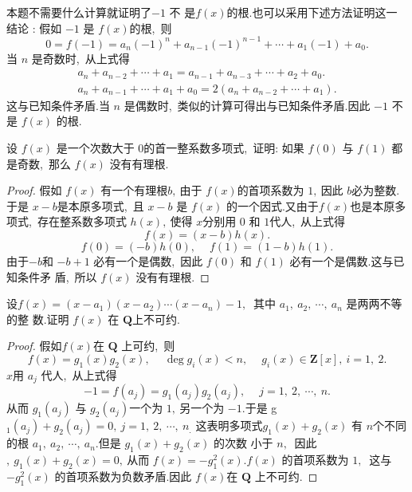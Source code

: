 \begin{note}
	本题不需要什么计算就证明了$-1$ 不 是$  f(x)  $的根.也可以采用下述方法证明这一结论 : 假如  $-1$  是 $ f(x)  $的根,\  则
	$$0=f(-1)=a_{n}(-1)^{n}+a_{n-1}(-1)^{n-1}+\cdots+a_{1}(-1)+a_{0} .$$
	当  $n $ 是奇数时,\  从上式得
	$$\begin{array}{l}
		a_{n}+a_{n-2}+\cdots+a_{1}=a_{n-1}+a_{n-3}+\cdots+a_{2}+a_{0} . \\
		a_{n}+a_{n-1}+\cdots+a_{1}+a_{0}=2\left(a_{n}+a_{n-2}+\cdots+a_{1}\right) .
	\end{array}$$
	这与已知条件矛盾.当 $ n $ 是偶数时,\  类似的计算可得出与已知条件矛盾.因此  $-1$  不是 $ f(x) $ 的根.
\end{note}
\newpage
\begin{problem}
	设  $f(x) $ 是一个次数大于 $0 $的首一整系数多项式,\  证明: 如果 $ f(0) $ 与 $ f(1) $ 都 是奇数,\ 那么  $f(x) $ 没有有理根.
\end{problem}
\begin{proof}
	假如 $ f(x) $ 有一个有理根$  b ,\  $由于 $ f(x)  $的首项系数为 $1 ,\  $因此  $b  $必为整数.于是  $x-b  $是本原多项式,\  且  $x-b $ 是  $f(x) $ 的一个因式.又由于$  f(x)  $也是本原多项式,\ 存在整系数多项式  $h(x) ,\  $使得
	$x  $分别用 $0$ 和 $1 $代人,\  从上式得
	$$f(x)=(x-b) h(x) .$$
	$$f(0)=(-b) h(0),\  \quad f(1)=(1-b) h(1) .$$
	由于$  -b  $和 $ -b+1 $ 必有一个是偶数,\  因此 $ f(0) $ 和 $ f(1) $ 必有一个是偶数.这与已知条件矛 盾,\  所以 $ f(x) $ 没有有理根.
\end{proof}
\newpage
\begin{problem}
	设$  f(x)=\left(x-a_{1}\right)\left(x-a_{2}\right) \cdots\left(x-a_{n}\right)-1 ,\ $ 其中 $ a_{1},\  a_{2},\  \cdots,\  a_{n}$  是两两不等的整 数.证明 $ f(x) $ 在  $\mathbf{Q}  $上不可约.
\end{problem}
\begin{proof}
	假如$  f(x)  $在 $ \mathbf{Q} $ 上可约,\  则
	$$f(x)=g_{1}(x) g_{2}(x),\  \quad \operatorname{deg} g_{i}(x)<n,\  \quad g_{i}(x) \in \mathbf{Z}[x],\  i=1,\ 2 .$$
	$x  $用 $ a_{j} $ 代人,\  从上式得
	$$-1=f\left(a_{j}\right)=g_{1}\left(a_{j}\right) g_{2}\left(a_{j}\right),\  \quad j=1,\ 2,\  \cdots,\  n .$$
	从而 $ g_{1}\left(a_{j}\right) $ 与 $ g_{2}\left(a_{j}\right)  $一个为 $1 ,\  $另一个为 $ -1  .$于是  g$_{1}\left(a_{j}\right)+g_{2}\left(a_{j}\right)=0,\  j=1,\ 2,\  \cdots,\  n_. $ 这表明多项式$  g_{1}(x)+g_{2}(x)$  有 $ n  $个不同的根 $ a_{1},\  a_{2},\  \cdots,\  a_{n}  .$但是 $ g_{1}(x)+g_{2}(x)$  的次数 小于  $n ,\ $ 因此$,\   g_{1}(x)+g_{2}(x)=0 ,\  $从而  $f(x)=-g_{1}^{2}(x) . f(x) $ 的首项系数为 $1 ,\ $ 这与 $ -g_{1}^{2}(x) $ 的首项系数为负数矛盾.因此  $f(x)  $在  $\mathbf{Q} $ 上不可约.
\end{proof}
